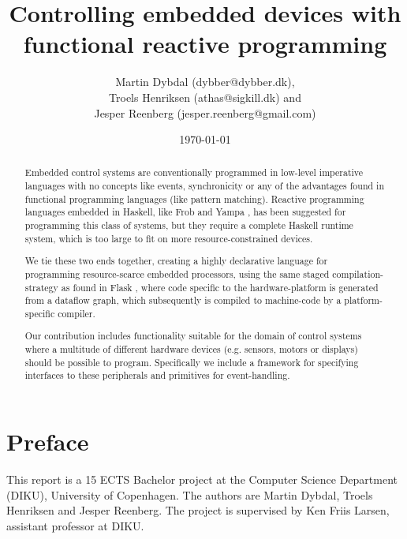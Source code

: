 \documentclass[a4paper, oneside, final]{memoir}
\title{Controlling embedded devices with functional reactive programming}
\author{Martin Dybdal (dybber@dybber.dk), \\
Troels Henriksen (athas@sigkill.dk) and \\
Jesper Reenberg (jesper.reenberg@gmail.com)
}
\date{\today}
\begin{document}
\frontmatter

\maketitle
\thispagestyle{empty}

\begin{abstract}
  Embedded control systems are conventionally programmed in low-level
  imperative languages with no concepts like events, synchronicity or
  any of the advantages found in functional programming languages
  (like pattern matching). Reactive programming languages embedded in
  Haskell, like Frob \cite{frob99} and Yampa \cite{arrowsrobotsfrp02},
  has been suggested for programming this class of systems, but they
  require a complete Haskell runtime system, which is too large to fit
  on more resource-constrained devices.

  We tie these two ends together, creating a highly declarative
  language for programming resource-scarce embedded processors, using
  the same staged com\-pi\-la\-tion-strategy as found in Flask
  \cite{flask08}, where code specific to the hardware-platform is
  generated from a dataflow graph, which subsequently is compiled to
  machine-code by a platform-specific compiler.

  Our contribution includes functionality suitable for the domain of
  control systems where a multitude of different hardware devices
  (e.g. sensors, motors or displays) should be possible to
  program. Specifically we include a framework for specifying
  interfaces to these peripherals and primitives for
  event-handling. 

\end{abstract}

\clearpage 
\chapter*{Preface}
This report is a 15 ECTS Bachelor project at the Computer Science
Department (DIKU), University of Copenhagen. The authors are Martin
Dybdal, Troels Henriksen and Jesper Reenberg. The project is
supervised by Ken Friis Larsen, assistant professor at DIKU.

\clearpage

\tableofcontents*



\end{document}
